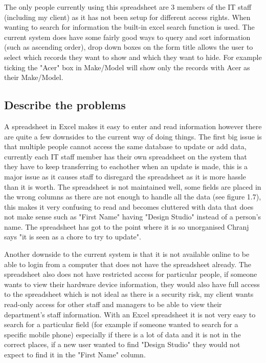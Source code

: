 The only people currently using this spreadsheet are 3 members of the IT staff (including my client) as it has not been setup for different access rights. When wanting to search for information the built-in excel search function is used. The current system does have some fairly good ways to query and sort information (such as ascending order), drop down boxes on the form title allows the user to select which records they want to show and which they want to hide. For example ticking the "Acer" box in Make/Model will show only the records with Acer as their Make/Model. 



\subsection{Describe the problems}

A spreadsheet in Excel makes it easy to enter and read information however there are quite a few downsides to the current way of doing things. The first  big issue is that multiple people cannot access the same database to update or add data, currently each IT staff member has their own spreadsheet on the system that they have to keep transferring to eachother when an update is made, this is a major issue as it causes staff to disregard the spreadsheet as it is more hassle than it is worth. The spreadsheet is not maintained well, some fields are placed in the wrong columns as there are not enough to handle all the data (see figure 1.7), this makes it very confusing to read and becomes cluttered with data that does not make sense such as "First Name" having "Design Studio" instead of a person's name. The spreadsheet has got to the point where it is so unorganised Chranj says "it is seen as a chore to try to update". 

Another downside to the current system is that it is not available online to be able to login from a computer that does not have the spreadsheet already. The spreadsheet also does not have restricted access for particular people, if someone wants to view their hardware device information, they would also have full access to the spreadsheet which is not ideal as there is a security risk, my client wants read-only access for other staff and managers to be able to view their department's staff information. With an Excel spreadsheet it is not very easy to search for a particular field (for example if someone wanted to search for a specific mobile phone) especially if there is a lot of data and it is not in the correct places, if a new user wanted to find "Design Studio" they would not expect to find it in the "First Name" column.

